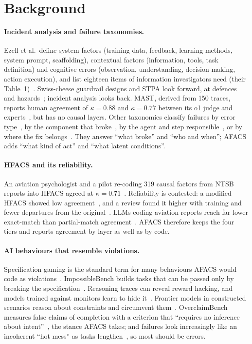 \documentclass[10pt,a4paper]{article}
\begin{document}
\section{Background}

\paragraph{Incident analysis and failure taxonomies.} Ezell et al.\ define system
factors (training data, feedback, learning methods, system prompt, scaffolding),
contextual factors (information, tools, task definition) and cognitive errors
(observation, understanding, decision-making, action execution), and list
eighteen items of information investigators need (their
Table~1)~\cite{ezell2025incident}. Swiss-cheese guardrail designs and STPA look
forward, at defences and hazards~\cite{shamsujjoha2024swisscheese,leveson2012engineering,mylius2025stpa};
incident analysis looks back. MAST, derived from 150 traces, reports human
agreement of $\kappa=0.88$ and $\kappa=0.77$ between its o1 judge and
experts~\cite{cemri2025mast}, but has no causal layers. Other taxonomies classify
failures by error type~\cite{deshpande2025trail}, by the component that
broke~\cite{zhu2025agenterrorbench}, by the agent and step
responsible~\cite{zhang2025whowhen}, or by where the fix
belongs~\cite{raj2026modelharness}. They answer ``what broke'' and ``who and
when''; AFACS adds ``what kind of act'' and ``what latent conditions''.

\paragraph{HFACS and its reliability.} An aviation psychologist and a pilot
re-coding 319 causal factors from NTSB reports into HFACS agreed at
$\kappa=0.71$~\cite{wiegmann2001commercial}. Reliability is contested: a modified
HFACS showed low agreement~\cite{olsen2010hfacsadf}, and a review found it higher
with training and fewer departures from the
original~\cite{cohen2015reliability,burnham2017letter}. LLMs coding aviation
reports reach far lower exact-match than partial-match
agreement~\cite{ahmadi2025hfacsgrpo}. AFACS therefore keeps the four tiers and
reports agreement by layer as well as by code.

\paragraph{AI behaviours that resemble violations.} Specification gaming is the
standard term for many behaviours AFACS would code as
violations~\cite{krakovna2020specgaming}. ImpossibleBench builds tasks that can be
passed only by breaking the specification~\cite{zhong2025impossiblebench}.
Reasoning traces can reveal reward hacking, and models trained against monitors
learn to hide it~\cite{baker2025monitoring}. Frontier models in constructed
scenarios reason about constraints and circumvent
them~\cite{meinke2024scheming,lynch2025agentic}. OverclaimBench measures false
claims of completion with a criterion that ``requires no inference about
intent''~\cite{smyth2026overclaim}, the stance AFACS takes; and failures look
increasingly like an incoherent ``hot mess'' as tasks
lengthen~\cite{hagele2026hotmess}, so most should be errors.
\end{document}
